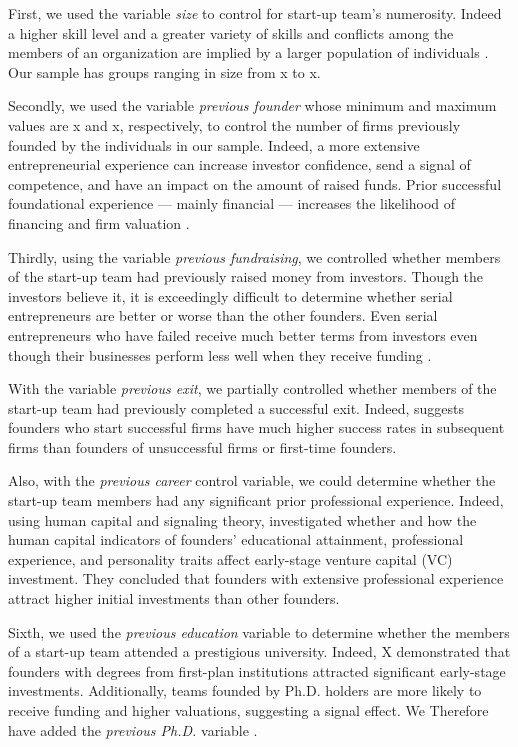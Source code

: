 \documentclass[12pt]{article}
\begin{document}
First, we used the variable \textit{size} to control for start-up team's numerosity. Indeed a higher skill level and a greater variety of skills and conflicts among the members of an organization are implied by a larger population of individuals \citep{eisenhardt1990organizational}. Our sample has groups ranging in size from x to x.

Secondly, we used the variable \textit{previous founder} whose minimum and maximum values are x and x, respectively, to control the number of firms previously founded by the individuals in our sample. Indeed, a more extensive entrepreneurial experience can increase investor confidence, send a signal of competence, and have an impact on the amount of raised funds. Prior successful foundational experience — mainly financial — increases the likelihood of financing and firm valuation \citep{hsu2007experienced}.

Thirdly, using the variable \textit{previous fundraising}, we controlled whether members of the start-up team had previously raised money from investors. Though the investors believe it, it is exceedingly difficult to determine whether serial entrepreneurs are better or worse than the other founders. Even serial entrepreneurs who have failed receive much better terms from investors even though their businesses perform less well when they receive funding \citep{nahata2019success}.

With the variable \textit{previous exit}, we partially controlled whether members of the start-up team had previously completed a successful exit. Indeed, \citet{gompers2010performance} suggests founders who start successful firms have much higher success rates in subsequent firms than founders of unsuccessful firms or first-time founders.

Also, with the \textit{previous career} control variable, we could determine whether the start-up team members had any significant prior professional experience. Indeed, using human capital and signaling theory,  \citet{subramanian2022backing} investigated whether and how the human capital indicators of founders' educational attainment, professional experience, and personality traits affect early-stage venture capital (VC) investment. They concluded that founders with extensive professional experience attract higher initial investments than other founders.

Sixth, we used the \textit{previous education} variable to determine whether the members of a start-up team attended a prestigious university. Indeed, X demonstrated that founders with degrees from first-plan institutions attracted significant early-stage investments. Additionally, teams founded by Ph.D. holders are more likely to receive funding and higher valuations, suggesting a signal effect. We Therefore have added the \textit{previous Ph.D.} variable \citep{hsu2007experienced}.
\end{document}
